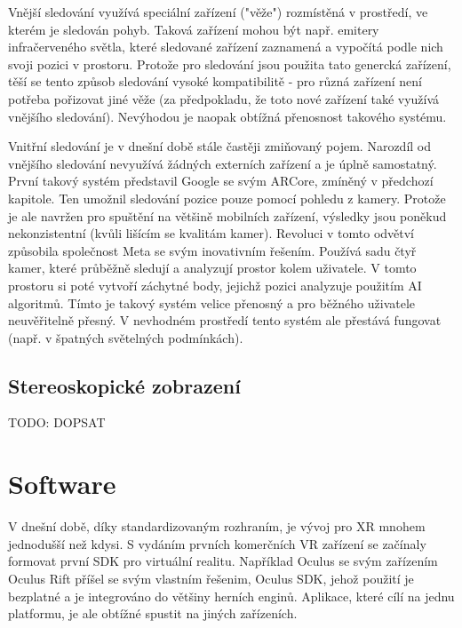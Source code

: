 Vnější sledování využívá speciální zařízení ("věže") rozmístěná v prostředí, ve kterém je sledován pohyb. Taková zařízení mohou být např. emitery infračerveného světla, které sledované zařízení zaznamená a vypočítá podle nich svoji pozici v prostoru. Protože pro sledování jsou použita tato genercká zařízení, těší se tento způsob sledování vysoké kompatibilitě - pro různá zařízení není potřeba pořizovat jiné věže (za předpokladu, že toto nové zařízení také využívá vnějšího sledování). Nevýhodou je naopak obtížná přenosnost takového systému. \cite{vr_tracking_suvi}

Vnitřní sledování je v dnešní době stále častěji zmiňovaný pojem. Narozdíl od vnějšího sledování nevyužívá žádných externích zařízení a je úplně samostatný. První takový systém představil Google se svým ARCore, zmíněný v předchozí kapitole. Ten umožnil sledování pozice pouze pomocí pohledu z kamery.  Protože je ale navržen pro spuštění na většině mobilních zařízení, výsledky jsou poněkud nekonzistentní (kvůli lišícím se kvalitám kamer).
Revoluci v tomto odvětví způsobila společnost Meta se svým inovativním řešením. Používá sadu čtyř kamer, které průběžně sledují a analyzují prostor kolem uživatele. V tomto prostoru si poté vytvoří záchytné body, jejichž pozici analyzuje použitím AI algoritmů. Tímto je takový systém velice přenosný a pro běžného uživatele neuvěřitelně přesný. V nevhodném prostředí tento systém ale přestává fungovat (např. v špatných světelných podmínkách). \cite{vr_tracking_suvi} \cite{enwiki:1182789097}

\section{Stereoskopické zobrazení}

TODO: DOPSAT

\chapter{Software}

V dnešní době, díky standardizovaným rozhraním, je vývoj pro XR mnohem jednodušší než kdysi. S vydáním prvních komerčních VR zařízení se začínaly formovat první \gls{SDK} pro virtuální realitu. Například Oculus se svým zařízením Oculus Rift příšel se svým vlastním řešenim, Oculus SDK, jehož použití je bezplatné a je integrováno do většiny herních enginů. Aplikace, které cílí na jednu platformu, je ale obtížné spustit na jiných zařízeních. \cite{enwiki:1193283032}

